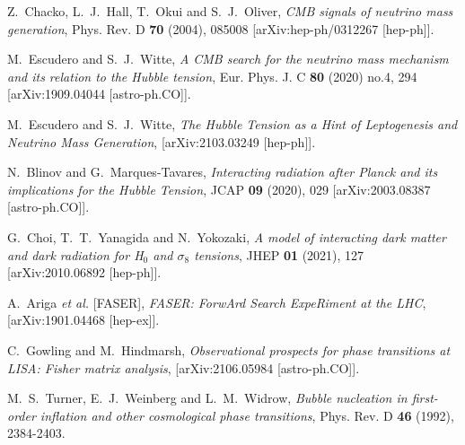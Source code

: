 \documentclass[a4paper,11pt]{article}
\begin{document}
\begin{thebibliography}{99}
Z.~Chacko, L.~J.~Hall, T.~Okui and S.~J.~Oliver,
{\em CMB signals of neutrino mass generation},
Phys. Rev. D \textbf{70} (2004), 085008
[arXiv:hep-ph/0312267 [hep-ph]].

M.~Escudero and S.~J.~Witte,
{\em A CMB search for the neutrino mass mechanism and its relation to the Hubble tension},
Eur. Phys. J. C \textbf{80} (2020) no.4, 294
[arXiv:1909.04044 [astro-ph.CO]].

M.~Escudero and S.~J.~Witte,
{\em The Hubble Tension as a Hint of Leptogenesis and Neutrino Mass Generation},
[arXiv:2103.03249 [hep-ph]].

N.~Blinov and G.~Marques-Tavares,
{\em Interacting radiation after Planck and its implications for the Hubble Tension},
JCAP \textbf{09} (2020), 029
[arXiv:2003.08387 [astro-ph.CO]].

G.~Choi, T.~T.~Yanagida and N.~Yokozaki,
{\em A model of interacting dark matter and dark radiation for H$_{0}$ and $\sigma_{8}$ tensions},
JHEP \textbf{01} (2021), 127
[arXiv:2010.06892 [hep-ph]].






A.~Ariga \textit{et al.} [FASER],
{\em FASER: ForwArd Search ExpeRiment at the LHC},
[arXiv:1901.04468 [hep-ex]].

C.~Gowling and M.~Hindmarsh,
{\em Observational prospects for phase transitions at LISA: Fisher matrix analysis},
[arXiv:2106.05984 [astro-ph.CO]].


M.~S.~Turner, E.~J.~Weinberg and L.~M.~Widrow,
{\em Bubble nucleation in first-order inflation and other cosmological phase transitions},
Phys. Rev. D \textbf{46} (1992), 2384-2403.

\end{thebibliography}
\end{document}
